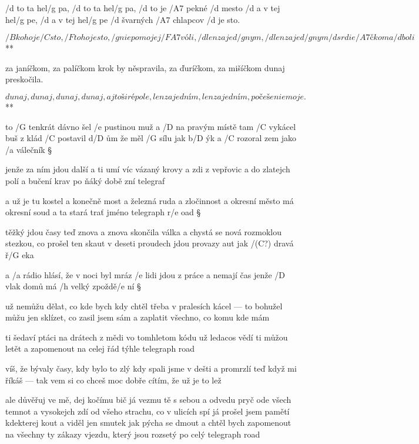 
/d to ta hel/g pa, /d to ta hel/g pa, /d to je /A7 pekné /d mesto
/d a v tej hel/g pe, /d a v tej hel/g pe /d švarných /A7 chlapcov /d je sto.

\R  \[ /B koho je /C sto, /F toho je sto, /g nie po mojej /{F A7} vóli,
    /d len za jed/g nym, /d len za jed/g nym /d srdie/A7 čko ma /d boli \] **

za janíčkom, za palíčkom krok by něspravila,
za ďuríčkom, za mišíčkom dunaj preskočila.

\R  \[ dunaj, dunaj, dunaj, dunaj, aj to širé pole,
    len za jedním, len za jedním, počešenie moje. \] **




to /G tenkrát dávno šel /e pustinou muž
a /D na pravým místě tam /C vykácel buš
z klád /C postavil d/D ům že měl /G sílu jak b/D ýk
a /C rozoral zem jako /a válečník \S

jenže za ním jdou další a ti umí víc
vázaný krovy a zdi z vepřovic
a do zlatejch polí a bučení krav
po ňáký době zní telegraf \s

a už je tu kostel a konečně most
a železná ruda a zločinnost
a okresní město má okresní soud
a ta stará trať jméno telegraph r/e oad \S

těžký jdou časy teď znova a znova
skončila válka a chystá se nová
rozmoklou stezkou, co prošel ten skaut
v deseti proudech jdou provazy aut
jak /(C?) dravá ř/G eka \s

a /a rádio hlásí, že v noci byl mráz
/e lidi jdou z práce a nemají čas
jenže /D vlak domů má /h velký zpoždě/e ní \S

už nemůžu dělat, co kde bych kdy chtěl
třeba v pralesích kácel --- to bohužel
můžu jen sklízet, co zasil jsem sám
a zaplatit všechno, co komu kde mám \s

ti šedaví ptáci na drátech z mědi
vo tomhletom kódu už ledacos vědí
ti můžou letět a zapomenout
na celej řád týhle telegraph road \songgg

víš, že bývaly časy, kdy bylo to zlý
kdy spali jsme v dešti a promrzlí
teď když mi říkáš --- tak vem si co chceš
moc dobře cítím, že už je to lež \s

ale důvěřuj ve mě, dej kočímu bič
já vezmu tě s sebou a odvedu pryč
ode všech temnot a vysokejch zdí
od všeho strachu, co v ulicích spí
já prošel jsem pamětí kdekterej kout
a viděl jen smutek jak pýcha se dmout
a chtěl bych zapomenout
na všechny ty zákazy vjezdu, který jsou rozsetý
po celý telegraph road



